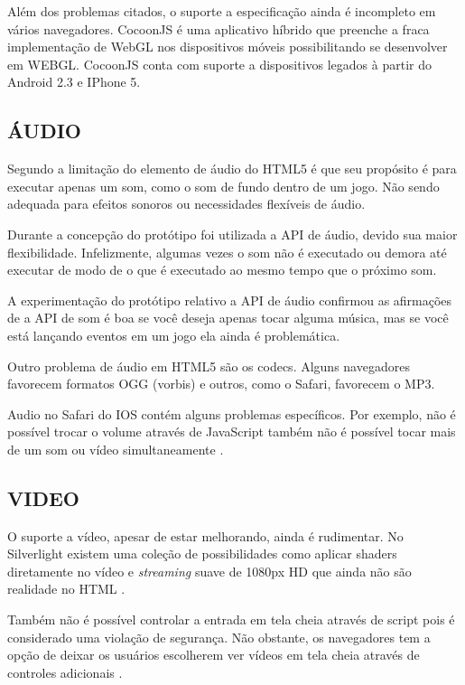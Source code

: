 Além dos problemas citados, o suporte a especificação ainda é
incompleto em vários navegadores. CocoonJS é uma aplicativo híbrido
que preenche a fraca implementação de WebGL nos dispositivos móveis
possibilitando se desenvolver em WEBGL. CocoonJS conta com suporte a
dispositivos legados à partir do Android 2.3 e IPhone 5.

\subsection{ÁUDIO}

Segundo \citet{html5mostwanted} a limitação do elemento de áudio do
HTML5 é que seu propósito é para executar apenas um som, como o som
de fundo dentro de um jogo. Não sendo adequada para efeitos sonoros 
ou necessidades flexíveis de áudio.

Durante a concepção do protótipo foi utilizada a API de áudio, devido
sua maior flexibilidade. Infelizmente, algumas vezes o som não é
executado ou demora até executar de modo de o que é executado ao mesmo
tempo que o próximo som.

A experimentação do protótipo relativo a API de áudio confirmou as
afirmações de \citet{html5mostwanted} a API de som é boa se você
deseja apenas tocar alguma música, mas se você está lançando eventos
em um jogo ela ainda é problemática.

Outro problema de áudio em HTML5 são os codecs. Alguns navegadores
favorecem formatos OGG (vorbis) e outros, como o Safari, favorecem o
MP3.

Audio no Safari do IOS contém alguns problemas específicos.
Por exemplo, não é possível trocar o volume através de
JavaScript também não é possível tocar mais de um som ou vídeo
simultaneamente \autocite{unsolvedMediaHtmlIssues}.

\subsection{VIDEO}

O suporte a vídeo, apesar de estar melhorando, ainda é rudimentar. No
Silverlight existem uma coleção de possibilidades como aplicar shaders
diretamente no vídeo e \textit{streaming} suave de 1080px HD que ainda
não são realidade no HTML \autocite[p. 8]{researchOnHtml}.

Também não é possível controlar a entrada em tela cheia através de script
pois é considerado uma violação de segurança. Não obstante,
os navegadores tem a opção de deixar os usuários escolherem ver
vídeos em tela cheia através de controles adicionais \autocite[pp.
68]{proHtml5}.

